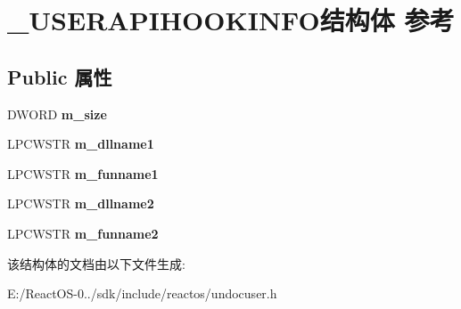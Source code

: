 \hypertarget{struct___u_s_e_r_a_p_i_h_o_o_k_i_n_f_o}{}\section{\+\_\+\+U\+S\+E\+R\+A\+P\+I\+H\+O\+O\+K\+I\+N\+F\+O结构体 参考}
\label{struct___u_s_e_r_a_p_i_h_o_o_k_i_n_f_o}
\subsection*{Public 属性}
\begin{DoxyCompactItemize}
\item 
\mbox{\label{struct___u_s_e_r_a_p_i_h_o_o_k_i_n_f_o_a72b50470dfb4283f188b1d5b4a5c492a}} 
D\+W\+O\+RD {\bfseries m\+\_\+size}
\item 
\mbox{\label{struct___u_s_e_r_a_p_i_h_o_o_k_i_n_f_o_aeca122cdb01817e6d34c9d600320c6ad}} 
L\+P\+C\+W\+S\+TR {\bfseries m\+\_\+dllname1}
\item 
\mbox{\label{struct___u_s_e_r_a_p_i_h_o_o_k_i_n_f_o_a56e3e80366f70bbd650898c39a3724e0}} 
L\+P\+C\+W\+S\+TR {\bfseries m\+\_\+funname1}
\item 
\mbox{\label{struct___u_s_e_r_a_p_i_h_o_o_k_i_n_f_o_a3748ef24e021c3069026fa50df576f1d}} 
L\+P\+C\+W\+S\+TR {\bfseries m\+\_\+dllname2}
\item 
\mbox{\label{struct___u_s_e_r_a_p_i_h_o_o_k_i_n_f_o_a02c7d2a85fc995c3ab787162c2ec9c78}} 
L\+P\+C\+W\+S\+TR {\bfseries m\+\_\+funname2}
\end{DoxyCompactItemize}


该结构体的文档由以下文件生成\+:\begin{DoxyCompactItemize}
\item 
E\+:/\+React\+O\+S-\/0../sdk/include/reactos/undocuser.\+h\end{DoxyCompactItemize}
